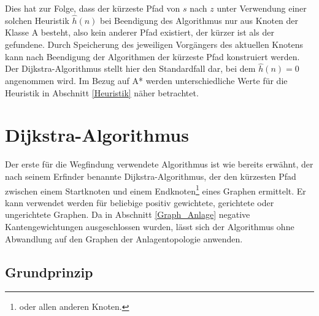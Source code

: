 		Dies hat zur Folge, dass der kürzeste Pfad von $s$ nach $z$ unter Verwendung einer solchen Heuristik $\hat{h}(n)$ bei Beendigung des Algorithmus nur aus Knoten der Klasse A besteht, also kein anderer Pfad existiert, der kürzer ist als der gefundene. Durch Speicherung des jeweiligen Vorgängers des aktuellen Knotens kann nach Beendigung der Algorithmen der kürzeste Pfad konstruiert werden. 
		\\
		Der Dijkstra-Algorithmus stellt hier den Standardfall dar, bei dem $\hat{h}(n)=0$ angenommen wird. Im Bezug auf A* werden unterschiedliche Werte für die Heuristik in Abschnitt \ref{Heuristik} näher betrachtet.
	
\section{Dijkstra-Algorithmus}
	Der erste für die Wegfindung verwendete Algorithmus ist wie bereits erwähnt, der nach seinem Erfinder benannte Dijkstra-Algorithmus, der den kürzesten Pfad zwischen einem Startknoten und einem Endknoten\footnote{oder allen anderen Knoten.} eines Graphen ermittelt. Er kann verwendet werden für beliebige positiv gewichtete, gerichtete oder ungerichtete Graphen. Da in Abschnitt \ref{Graph_Anlage} negative Kantengewichtungen ausgeschlossen wurden, lässt sich der Algorithmus ohne Abwandlung auf den Graphen der Anlagentopologie anwenden.
	
	\subsection{Grundprinzip}
		\label{Dijkstra_Alg}
		
